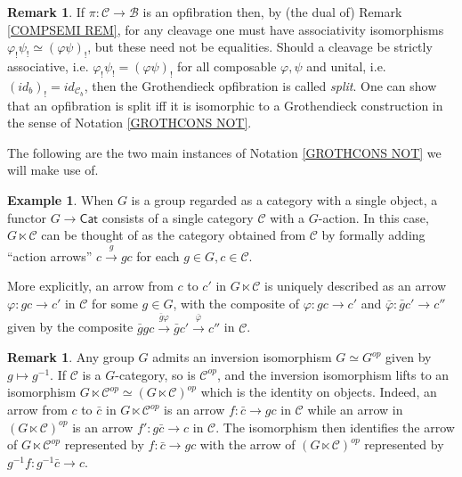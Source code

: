 \documentclass[a4paper,10pt
]{article}%
\numberwithin{equation}{section}
\numberwithin{figure}{section}
\theoremstyle{definition} %
\newtheorem{example}[equation]{Example}%
\newtheorem{remark}[equation]{Remark}%
\newcommand{\C}{\ensuremath{\mathcal C}}
\newcommand{\1}{\ensuremath{\mathbbm 1}}%
\begin{document}
\begin{remark}\label{SPLITOPFIB REM}
	If $\pi \colon \mathcal{C} \to \mathcal{B}$
	is an opfibration then, by (the dual of) Remark \ref{COMPSEMI REM},
	for any cleavage one must have associativity isomorphisms
	$\varphi_! \psi_! \simeq \left(\varphi \psi\right)_!$,
	but these need not be equalities.
	Should a cleavage be strictly associative, i.e. 
	$\varphi_! \psi_! = \left(\varphi \psi\right)_!$
	for all composable $\varphi,\psi$
	and unital, i.e.
	$(id_b)_! = id_{\mathcal{C}_b}$,
	then the Grothendieck opfibration is called \emph{split}.
	One can show that an opfibration is split iff it is isomorphic to a Grothendieck construction in the sense of Notation \ref{GROTHCONS NOT}.
\end{remark}


The following are the two main instances of 
Notation \ref{GROTHCONS NOT} we will make use of.



\begin{example}\label{GLTIMES EQ}
	When $G$ is a group regarded as a category with a single object,
	a functor
	$G \to \mathsf{Cat}$
	consists of a single category $\C$ with a $G$-action.
	In this case, $G \ltimes \mathcal{C}$
	can be thought of as the category obtained from $\mathcal{C}$
	by formally adding ``action arrows''
	$c \xrightarrow{g} gc$ for each $g\in G,c\in \mathcal{C}$.
	
	More explicitly, an arrow from $c$ to $c'$
	in $G \ltimes \mathcal{C}$
	is uniquely described as an arrow
	$\varphi \colon gc \to c'$ in $\mathcal{C}$ for some $g \in G$,
	with the composite of 
	$\varphi \colon gc \to c'$
	and
	$\bar{\varphi} \colon \bar{g}c' \to c''$
	given by
	the composite
	$ \bar{g}g c \xrightarrow{\bar{g} \varphi} \bar{g}c' \xrightarrow{\bar{\varphi}} c''$ in $\C$.
\end{example}




\begin{remark}\label{INVLTIMES REM}
	Any group $G$ admits an inversion isomorphism
	$G \simeq G^{op}$ given by $g \mapsto g^{-1}$.
	If $\mathcal{C}$ is a $G$-category, 
	so is $\mathcal{C}^{op}$,
	and the inversion isomorphism lifts
	to an isomorphism
	$G \ltimes \mathcal{C}^{op} \simeq \left(G \ltimes \mathcal{C}\right)^{op}$ which is the identity on objects.
	Indeed, an arrow from $c$ to $\bar{c}$
	in $G \ltimes \mathcal{C}^{op}$
	is an arrow $f \colon \bar{c} \to gc$ in $\mathcal{C}$
	while an arrow in $\left(G \ltimes \mathcal{C}\right)^{op}$
	is an arrow
	$f' \colon g \bar{c} \to c$ in $\mathcal{C}$.
	The isomorphism then identifies 
	the arrow of $G \ltimes \mathcal{C}^{op}$
	represented by
	$f \colon \bar{c} \to gc$ 
	with the arrow of $\left(G \ltimes \mathcal{C}\right)^{op}$
	represented by
	$g^{-1}f \colon g^{-1}\bar{c} \to c$.
\end{remark}
\end{document}
